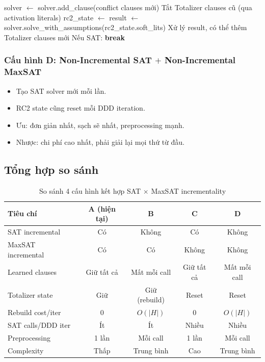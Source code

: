 \documentclass[11pt,a4paper]{article}
\begin{document}
\begin{algorithm}[H]
\caption{Cấu hình C: Incremental SAT $+$ Non-Incremental MaxSAT}
\begin{algorithmic}[1]
\State solver $\gets$  
\Loop {}
  \State solver.add\_clause(conflict clauses mới) 
  \State Tắt Totalizer clauses cũ (qua activation literals)
  \State rc2\_state $\gets$  
  \Loop {}
    \State result $\gets$ solver.solve\_with\_assumptions(rc2\_state.soft\_lits)
    \State Xử lý result, có thể thêm Totalizer clauses mới
    \State Nếu SAT: \textbf{break}
  \EndLoop
\EndLoop
\end{algorithmic}
\end{algorithm}

\subsubsection{Cấu hình D: Non-Incremental SAT $+$ Non-Incremental MaxSAT}

\begin{itemize}
  \item Tạo SAT solver mới mỗi lần.
  \item RC2 state cũng reset mỗi DDD iteration.
  \item Ưu: đơn giản nhất, sạch sẽ nhất, preprocessing mạnh.
  \item Nhược: chi phí cao nhất, phải giải lại mọi thứ từ đầu.
\end{itemize}

\subsection{Tổng hợp so sánh}

\begin{table}[h]
\centering
\small
\begin{tabular}{lcccc}
\toprule
\textbf{Tiêu chí} & \textbf{A (hiện tại)} & \textbf{B} & \textbf{C} & \textbf{D} \\
\midrule
SAT incremental & Có & Không & Có & Không \\
MaxSAT incremental & Có & Có & Không & Không \\
\midrule
Learned clauses & Giữ tất cả & Mất mỗi call & Giữ tất cả & Mất mỗi call \\
Totalizer state & Giữ & Giữ (rebuild) & Reset & Reset \\
Rebuild cost/iter & 0 & $O(|H|)$ & 0 & $O(|H|)$ \\
SAT calls/DDD iter & Ít & Ít & Nhiều & Nhiều \\
Preprocessing & 1 lần & Mỗi call & 1 lần & Mỗi call \\
Complexity & Thấp & Trung bình & Cao & Trung bình \\
\bottomrule
\end{tabular}
\caption{So sánh 4 cấu hình kết hợp SAT $\times$ MaxSAT incrementality}
\end{table}
\end{document}
